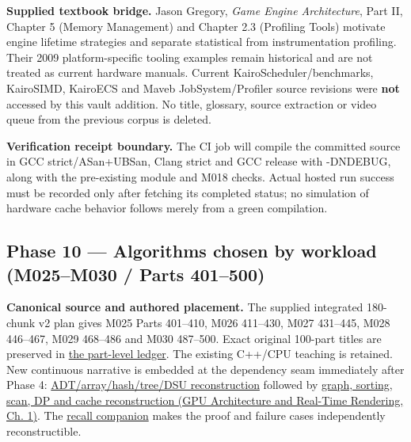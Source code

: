 \textbf{Supplied textbook bridge.} Jason Gregory, \emph{Game Engine Architecture}, Part II, Chapter 5 (Memory Management) and Chapter 2.3 (Profiling Tools) motivate engine lifetime strategies and separate statistical from instrumentation profiling. Their 2009 platform-specific tooling examples remain historical and are not treated as current hardware manuals. Current KairoScheduler/benchmarks, KairoSIMD, KairoECS and Maveb JobSystem/Profiler source revisions were \textbf{not} accessed by this vault addition. No title, glossary, source extraction or video queue from the previous corpus is deleted.

\textbf{Verification receipt boundary.} The CI job will compile the committed source in GCC strict/ASan+UBSan, Clang strict and GCC release with -DNDEBUG, along with the pre-existing module and M018 checks. Actual hosted run success must be recorded only after fetching its completed status; no simulation of hardware cache behavior follows merely from a green compilation.

\subsection{Phase 10 --- Algorithms chosen by workload (M025--M030 / Parts 401--500)}\label{appendix-a103e7846d21-phase-10-algorithms-chosen-by-workload-m025m030-parts-401500}

\textbf{Canonical source and authored placement.} The supplied integrated 180-chunk v2 plan gives M025 Parts 401--410, M026 411--430, M027 431--445, M028 446--467, M029 468--486 and M030 487--500. Exact original 100-part titles are preserved in \hyperref[appendix-fd090d982a15-phase-5-algorithms-and-data-structure-workload-contracts-parts-401500]{the part-level ledger}. The existing C++/CPU teaching is retained. New continuous narrative is embedded at the dependency seam immediately after Phase 4: \hyperref[01-foundations-i-ch007-the-scene-is-now-too-large-for-the-wrong-container-phase-5-m025m027-parts-401445]{ADT/array/hash/tree/DSU reconstruction} followed by \href{../06-GPU-Architecture-and-Real-Time-Rendering/main.pdf\#nameddest=01-foundations-i-ch008-from-an-asset-map-to-a-correct-navigable-world-phase-5-m028m030-parts-446500}{graph, sorting, scan, DP and cache reconstruction (GPU Architecture and Real-Time Rendering, Ch. 1)}. The \hyperref[appendix-8a046b38375e]{recall companion} makes the proof and failure cases independently reconstructible.

